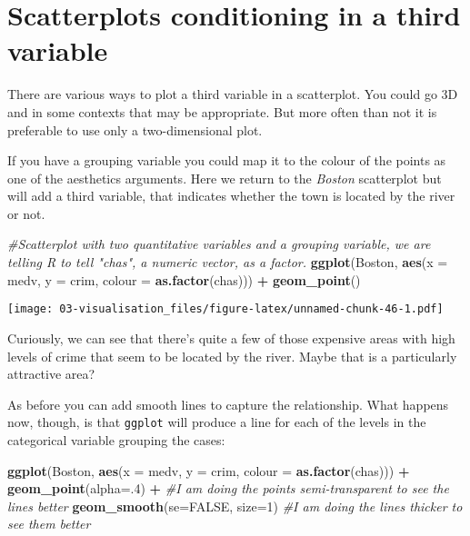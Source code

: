 \documentclass[
]{book}
\newenvironment{Shaded}{\begin{snugshade}}{\end{snugshade}}
\newcommand{\AttributeTok}[1]{\textcolor[rgb]{0.13,0.29,0.53}{#1}}
\newcommand{\CommentTok}[1]{\textcolor[rgb]{0.56,0.35,0.01}{\textit{#1}}}
\newcommand{\ConstantTok}[1]{\textcolor[rgb]{0.56,0.35,0.01}{#1}}
\newcommand{\DecValTok}[1]{\textcolor[rgb]{0.00,0.00,0.81}{#1}}
\newcommand{\FunctionTok}[1]{\textcolor[rgb]{0.13,0.29,0.53}{\textbf{#1}}}
\newcommand{\NormalTok}[1]{#1}
\newcommand{\SpecialCharTok}[1]{\textcolor[rgb]{0.81,0.36,0.00}{\textbf{#1}}}
\begin{document}
\section{Scatterplots conditioning in a third variable}\label{scatterplots-conditioning-in-a-third-variable}

There are various ways to plot a third variable in a scatterplot. You could go 3D and in some contexts that may be appropriate. But more often than not it is preferable to use only a two-dimensional plot.

If you have a grouping variable you could map it to the colour of the points as one of the aesthetics arguments. Here we return to the \emph{Boston} scatterplot but will add a third variable, that indicates whether the town is located by the river or not.

\begin{Shaded}
\begin{Highlighting}[]
\CommentTok{\#Scatterplot with two quantitative variables and a grouping variable, we are telling R to tell "chas", a numeric vector, as a factor. }
\FunctionTok{ggplot}\NormalTok{(Boston, }\FunctionTok{aes}\NormalTok{(}\AttributeTok{x =}\NormalTok{ medv, }\AttributeTok{y =}\NormalTok{ crim, }\AttributeTok{colour =} \FunctionTok{as.factor}\NormalTok{(chas))) }\SpecialCharTok{+}
  \FunctionTok{geom\_point}\NormalTok{() }
\end{Highlighting}
\end{Shaded}

\texttt{[image: 03-visualisation\_files/figure-latex/unnamed-chunk-46-1.pdf]}

Curiously, we can see that there's quite a few of those expensive areas with high levels of crime that seem to be located by the river. Maybe that is a particularly attractive area?

As before you can add smooth lines to capture the relationship. What happens now, though, is that \texttt{ggplot} will produce a line for each of the levels in the categorical variable grouping the cases:

\begin{Shaded}
\begin{Highlighting}[]
\FunctionTok{ggplot}\NormalTok{(Boston, }\FunctionTok{aes}\NormalTok{(}\AttributeTok{x =}\NormalTok{ medv, }\AttributeTok{y =}\NormalTok{ crim, }\AttributeTok{colour =} \FunctionTok{as.factor}\NormalTok{(chas))) }\SpecialCharTok{+}
  \FunctionTok{geom\_point}\NormalTok{(}\AttributeTok{alpha=}\NormalTok{.}\DecValTok{4}\NormalTok{) }\SpecialCharTok{+} \CommentTok{\#I am doing the points semi{-}transparent to see the lines better}
  \FunctionTok{geom\_smooth}\NormalTok{(}\AttributeTok{se=}\ConstantTok{FALSE}\NormalTok{, }\AttributeTok{size=}\DecValTok{1}\NormalTok{) }\CommentTok{\#I am doing the lines thicker to see them better}
\end{Highlighting}
\end{Shaded}
\end{document}
